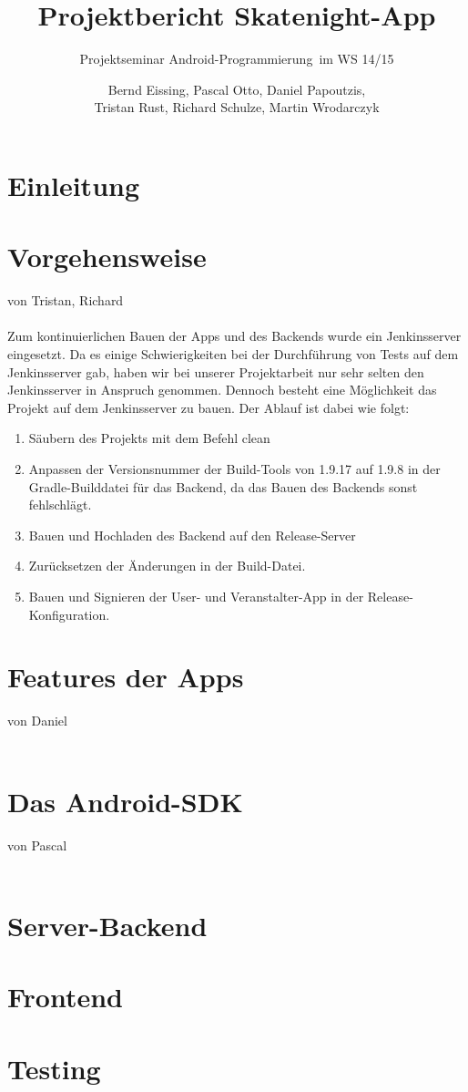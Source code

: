 \documentclass[a4paper, titlepage]{scrartcl}
\title{Projektbericht Skatenight-App}
\subtitle{Projektseminar \glqq Android-Programmierung\grqq\ im WS 14/15}
\author{Bernd Eissing, Pascal Otto, Daniel Papoutzis,\\Tristan Rust, Richard Schulze, Martin Wrodarczyk}
\date{}
\newcommand{\AUTHOR}[1]{
	von #1 \\ \\
}
\begin{document}
\maketitle

\tableofcontents
\newpage

\section{Einleitung}

\section{Vorgehensweise}
\AUTHOR{Tristan, Richard}

Zum kontinuierlichen Bauen der Apps und des Backends wurde ein Jenkinsserver eingesetzt. Da es einige Schwierigkeiten bei der Durchführung von Tests auf dem Jenkinsserver gab, haben wir bei unserer Projektarbeit nur sehr selten den Jenkinsserver in Anspruch genommen. Dennoch besteht eine Möglichkeit das Projekt auf dem Jenkinsserver zu bauen. Der Ablauf ist dabei wie folgt:

\begin{enumerate}
	\item Säubern des Projekts mit dem Befehl \glqq clean\grqq
	\item Anpassen der Versionsnummer der Build-Tools von 1.9.17 auf 1.9.8 in der Gradle-Builddatei für das Backend, da das Bauen des Backends sonst fehlschlägt.
	\item Bauen und Hochladen des Backend auf den Release-Server
	\item Zurücksetzen der Änderungen in der Build-Datei.
	\item Bauen und Signieren der User- und Veranstalter-App in der Release-Konfiguration.
\end{enumerate}

\section{Features der Apps}
\AUTHOR{Daniel}

\section{Das Android-SDK}
\AUTHOR{Pascal}

\section{Server-Backend}


\section{Frontend}


\section{Testing}

\end{document}
